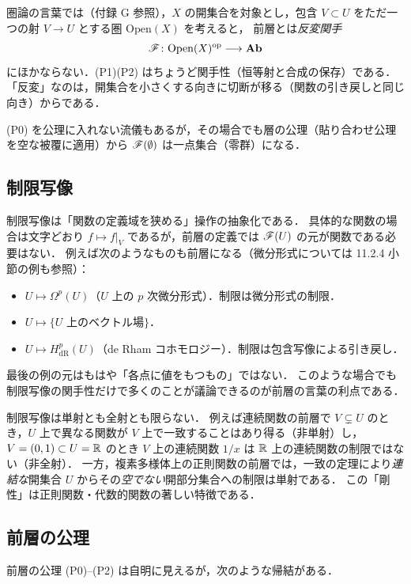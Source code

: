 圏論の言葉では（付録 G 参照），$X$ の開集合を対象とし，包含 $V\subset U$ をただ一つの射 $V\to U$ とする圏 $\mathrm{Open}(X)$ を考えると，
前層とは\emph{反変関手}
\[
  \mathscr{F}\colon \mathrm{Open}(X)^{\mathrm{op}}\longrightarrow \mathbf{Ab}
\]
にほかならない．(P1)(P2) はちょうど関手性（恒等射と合成の保存）である．
「反変」なのは，開集合を小さくする向きに切断が移る（関数の引き戻しと同じ向き）からである．

\begin{note}
(P0) を公理に入れない流儀もあるが，その場合でも層の公理（貼り合わせ公理を空な被覆に適用）から $\mathscr{F}(\emptyset)$ は一点集合（零群）になる．
\end{note}

\subsection{制限写像}

制限写像は「関数の定義域を狭める」操作の抽象化である．
具体的な関数の場合は文字どおり $f\mapsto f|_V$ であるが，前層の定義では $\mathscr{F}(U)$ の元が関数である必要はない．
例えば次のようなものも前層になる（微分形式については 11.2.4 小節の例も参照）：
\begin{itemize}
  \item $U\mapsto \Omega^p(U)$（$U$ 上の $p$ 次微分形式）．制限は微分形式の制限．
  \item $U\mapsto \{U \text{ 上のベクトル場}\}$．
  \item $U\mapsto H^p_{\mathrm{dR}}(U)$（de Rham コホモロジー）．制限は包含写像による引き戻し．
\end{itemize}
最後の例の元はもはや「各点に値をもつもの」ではない．
このような場合でも制限写像の関手性だけで多くのことが議論できるのが前層の言葉の利点である．

制限写像は単射とも全射とも限らない．
例えば連続関数の前層で $V\subsetneq U$ のとき，$U$ 上で異なる関数が $V$ 上で一致することはあり得る（非単射）し，
$V=(0,1)\subset U=\mathbb{R}$ のとき $V$ 上の連続関数 $1/x$ は $\mathbb{R}$ 上の連続関数の制限ではない（非全射）．
一方，複素多様体上の正則関数の前層では，一致の定理により\emph{連結な}開集合 $U$ からその\emph{空でない}開部分集合への制限は単射である．
この「剛性」は正則関数・代数的関数の著しい特徴である．

\subsection{前層の公理}

前層の公理 (P0)--(P2) は自明に見えるが，次のような帰結がある．

